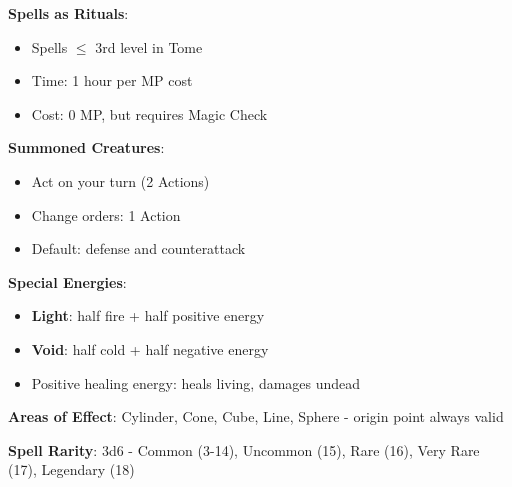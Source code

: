 \documentclass[10pt,a4paper,landscape]{article}
\begin{document}
	\begin{tcolorbox}[title=RITUALS AND SPECIAL RULES]
		\textbf{Spells as Rituals}: 
		\begin{itemize}[leftmargin=*,noitemsep]
			\item Spells $\leq$ 3rd level in Tome
			\item Time: 1 hour per MP cost
			\item Cost: 0 MP, but requires Magic Check
		\end{itemize}
		
		\textbf{Summoned Creatures}:
		\begin{itemize}[leftmargin=*,noitemsep]
			\item Act on your turn (2 Actions)
			\item Change orders: 1 Action
			\item Default: defense and counterattack
		\end{itemize}
		
		\textbf{Special Energies}:
		\begin{itemize}[leftmargin=*,noitemsep]
			\item \textbf{Light}: half fire + half positive energy
			\item \textbf{Void}: half cold + half negative energy
			\item Positive healing energy: heals living, damages undead
		\end{itemize}
		
		\textbf{Areas of Effect}: Cylinder, Cone, Cube, Line, Sphere - origin point always valid
		
		\textbf{Spell Rarity}: 3d6 - Common (3-14), Uncommon (15), Rare (16), Very Rare (17), Legendary (18)
	\end{tcolorbox}
	
\end{document}
